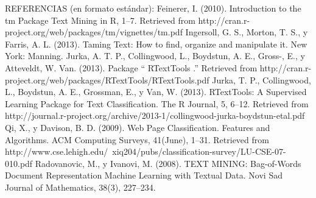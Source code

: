 REFERENCIAS (en formato estándar):
Feinerer, I. (2010). Introduction to the tm Package Text Mining in R, 1–7. Retrieved from http://cran.r-project.org/web/packages/tm/vignettes/tm.pdf
Ingersoll, G. S., Morton, T. S., y Farris, A. L. (2013). Taming Text: How to find, organize and manipulate it. New York: Manning.
Jurka, A. T. P., Collingwood, L., Boydstun, A. E., Gross-, E., y Atteveldt, W. Van. (2013). Package “ RTextTools .” Retrieved from http://cran.r-project.org/web/packages/RTextTools/RTextTools.pdf
Jurka, T. P., Collingwood, L., Boydstun, A. E., Grossman, E., y Van, W. (2013). RTextTools: A Supervised Learning Package for Text Classification. The R Journal, 5, 6–12. Retrieved from http://journal.r-project.org/archive/2013-1/collingwood-jurka-boydstun-etal.pdf
Qi, X., y Davison, B. D. (2009). Web Page Classification. Features and Algorithms. ACM Computing Surveys, 41(June), 1–31. Retrieved from http://www.cse.lehigh.edu/~xiq204/pubs/classification-survey/LU-CSE-07-010.pdf
Radovanovic, M., y Ivanovi, M. (2008). TEXT MINING: Bag-of-Words Document Representation Machine Learning with Textual Data. Novi Sad Journal of Mathematics, 38(3), 227–234.



%

%
